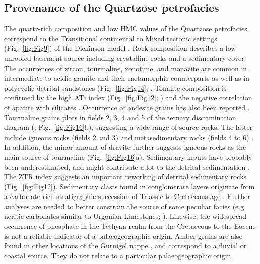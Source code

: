 \documentclass[twoside]{article}
\begin{document}

\subsection{Provenance of the Quartzose petrofacies}

The quartz-rich composition and low HMC values of the Quartzose petrofacies correspond to the Transitional continental to Mixed tectonic settings (Fig.~\ref{fig:Fig9}) of the Dickinson model \citep{Dickinson1985,Dickinson1979a}. Rock composition describes a low unroofed basement source including crystalline rocks and a sedimentary cover. The occurrences of zircon, tourmaline, xenotime, and monazite are common in intermediate to acidic granite and their metamorphic counterparts as well as in polycyclic detrital sandstones (Fig.~\ref{fig:Fig14}; \citealp{Mange1992,Stefani2007,Eynatten2012}. Tonalite composition is confirmed by the high ATi index (Fig.~\ref{fig:Fig12}; \citealp{Butler2011}) and the negative correlation of apatite with silicates \citep{Eynatten2012}. Occurrence of andesite grains has also been reported \citep{Ospina-Ostios2013}. Tourmaline grains plots in fields 2, 3, 4 and 5 of the ternary discrimination diagram (\citealp{Henry1985}; Fig.~\ref{fig:Fig16}b), suggesting a wide range of source rocks. The latter include igneous rocks (fields 2 and 3) and metasedimentary rocks (fields 4 to 6) \cite{Henry1985,Mange1992}. In addition, the minor amount of dravite further suggests igneous rocks as the main source of tourmaline (Fig.~\ref{fig:Fig16}a). Sedimentary inputs have probably been underestimated, and might contribute a lot to the detrital sedimentation \citep{Picard2007}. The ZTR index suggests an important reworking of detrital sedimentary rocks (Fig.~\ref{fig:Fig12}). Sedimentary clasts found in conglomerate layers originate from a carbonate-rich stratigraphic succession of Triassic to Cretaceous age \citep{Ragusa2015}. Further analyses are needed to better constrain the source of some peculiar facies (e.g. neritic carbonates similar to Urgonian Limestones; \citealp{Lombard1940a}). Likewise, the widespread occurrence of phosphate in the Tethyan realm from the Cretaceous to the Eocene \citep{Broudoux1985,Notholt1989,Follmi1990} is not a reliable indicator of a palaeogeographic origin. Amber grains are also found in other locations of the Gurnigel nappe \citep{Tercier1928a}, and correspond to a fluvial or coastal source. They do not relate to a particular palaeogeographic origin.\par
\end{document}
